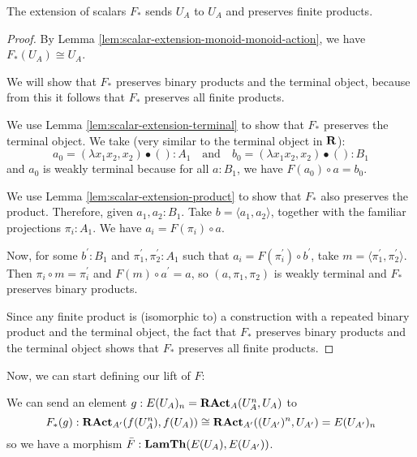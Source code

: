 \begin{lemma}
  The extension of scalars $ F_* $ sends $ U_A $ to $ U_A $ and preserves finite products.
\end{lemma}
\begin{proof}
  By Lemma \ref{lem:scalar-extension-monoid-monoid-action}, we have $ F_*(U_A) \cong U_A $.

  We will show that $ F_* $ preserves binary products and the terminal object, because from this it follows that $ F_* $ preserves all finite products.

  We use Lemma \ref{lem:scalar-extension-terminal} to show that $ F_* $ preserves the terminal object. We take (very similar to the terminal object in $ \mathbf{R} $):
  \[ a_0 = (\lambda x_1 x_2, x_2) \bullet () : A_1 \quad \text{and} \quad b_0 = (\lambda x_1 x_2, x_2) \bullet () : B_1 \]
  and $ a_0 $ is weakly terminal because for all $ a : B_1 $, we have $ F(a_0) \circ a = b_0 $.

  We use Lemma \ref{lem:scalar-extension-product} to show that $ F_* $ also preserves the product. Therefore, given $ a_1, a_2 : B_1 $. Take $ b = \langle a_1, a_2 \rangle $, together with the familiar projections $ \pi_i : A_1 $. We have $ a_i = F(\pi_i) \circ a $.

  Now, for some $ b^\prime: B_1 $ and $ \pi_1^\prime, \pi_2^\prime: A_1 $ such that $ a_i = F(\pi_i^\prime) \circ b^\prime $, take $ m = \langle \pi_1^\prime, \pi_2^\prime \rangle $. Then $ \pi_i \circ m = \pi_i^\prime $ and $ F(m) \circ a^\prime = a $, so $ (a, \pi_1, \pi_2) $ is weakly terminal and $ F_* $ preserves binary products.

  Since any finite product is (isomorphic to) a construction with a repeated binary product and the terminal object, the fact that $ F_* $ preserves binary products and the terminal object shows that $ F_* $ preserves all finite products.
\end{proof}

Now, we can start defining our lift of $ F $:
\begin{definition}
  We can send an element $ g: E(U_A)_n = \mathbf{RAct}_{A}(U_A^n, U_A) $ to
  \[ F_*(g): \mathbf{RAct}_{A^\prime}(f(U_A^n), f(U_A)) \cong \mathbf{RAct}_{A^\prime}((U_{A^\prime})^n, U_{A^\prime}) = E(U_{A^\prime})_n \]
  so we have a morphism $ \bar F: \mathbf{LamTh}(E(U_A), E(U_{A^\prime})) $.
\end{definition}

